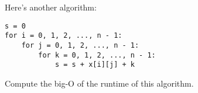 Here's another algorithm:
\begin{Verbatim}[frame=single, fontsize=\small]
s = 0
for i = 0, 1, 2, ..., n - 1:
    for j = 0, 1, 2, ..., n - 1:
        for k = 0, 1, 2, ..., n - 1:
            s = s + x[i][j] + k
\end{Verbatim}
Compute the big-O of the runtime of this algorithm.
